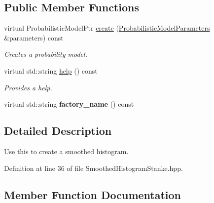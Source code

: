 \subsection*{Public Member Functions}
\begin{DoxyCompactItemize}
\item 
virtual Probabilistic\+Model\+Ptr \hyperlink{classtops_1_1SmoothedHistogramStanke_a2d04479a872f3f139652a55632a27e00}{create} (\hyperlink{classtops_1_1ProbabilisticModelParameters}{Probabilistic\+Model\+Parameters} \&parameters) const
\begin{DoxyCompactList}\small\item\em Creates a probability model. \end{DoxyCompactList}\item 
\mbox{\label{classtops_1_1SmoothedHistogramStanke_af10fc71d26da0c61cfa393fdc6f2fac8}} 
virtual std\+::string \hyperlink{classtops_1_1SmoothedHistogramStanke_af10fc71d26da0c61cfa393fdc6f2fac8}{help} () const
\begin{DoxyCompactList}\small\item\em Provides a help. \end{DoxyCompactList}\item 
\mbox{\label{classtops_1_1SmoothedHistogramStanke_a2f452280a2a1b2519952c8df9e5186db}} 
virtual std\+::string {\bfseries factory\+\_\+name} () const
\end{DoxyCompactItemize}


\subsection{Detailed Description}
Use this to create a smoothed histogram. 

Definition at line 36 of file Smoothed\+Histogram\+Stanke.\+hpp.



\subsection{Member Function Documentation}
\mbox{\label{classtops_1_1SmoothedHistogramStanke_a2d04479a872f3f139652a55632a27e00}} 
